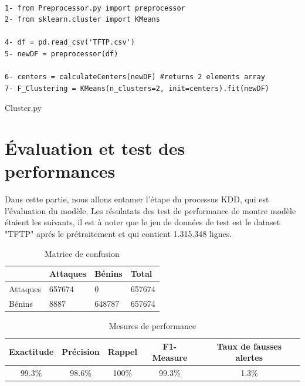 \begin{algorithm}[H]
\begin{verbatim}

1- from Preprocessor.py import preprocessor 
2- from sklearn.cluster import KMeans

4- df = pd.read_csv('TFTP.csv')
5- newDF = preprocessor(df)

6- centers = calculateCenters(newDF) #returns 2 elements array
7- F_Clustering = KMeans(n_clusters=2, init=centers).fit(newDF) 

\end{verbatim}
\caption{Cluster.py}
\end{algorithm}

\section{Évaluation et test des performances}
Dans cette partie, nous allons entamer l'étape du processus KDD, qui est l'évaluation du modèle. Les résulatats des test de performance de montre modèle étaient les suivants, il est à noter que le jeu de données de test est le dataset "TFTP" aprés le prétraitement et qui contient 1.315.348 lignes.

\begin{table}[h]
	\begin{center}
		\begin{tabular}{  | m{2.5cm} | m{2.5cm} | m{2.5cm} || m{2cm} | }
			\hline
			  & Attaques & Bénins & Total\\
			\hline
			Attaques & 657674 & 0 & 657674\\
			\hline
			Bénins & 8887 & 648787 & 657674\\
			\hline
		\end{tabular}
		\caption{Matrice de confusion}
	\end{center}
	\label{table:NIDS_Evaluation}
\end{table}

\begin{table}[h]
	\begin{center}
		\begin{tabular}{  | c | c | c | c | c | }
			\hline
			\rowcolor[rgb]{0.85,0.85,0.85}
			 Exactitude & Précision & Rappel & F1-Measure & Taux de fausses alertes\\
			\hline
			99.3\% & 98.6\% & 100\% & 99.3\% & 1.3\%\\
			\hline
		\end{tabular}
		\caption{Mesures de performance }
	\end{center}
	\label{table:F_Clustering_Evaluation}
\end{table}

